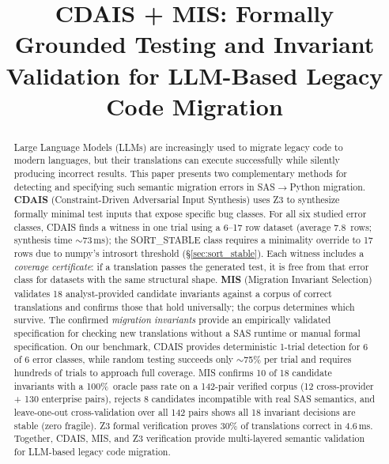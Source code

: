 \documentclass[conference]{IEEEtran}
\title{CDAIS + MIS: Formally Grounded Testing and Invariant\\
       Validation for LLM-Based Legacy Code Migration}
\author{
  \IEEEauthorblockN{Tesnime Ellabout}
  \IEEEauthorblockA{
    TekUp University\\
    Ariana 2083, Tunisia\\
    \texttt{ellaboutesnime@gmail.com}
  }

   \and
   \IEEEauthorblockN{Haythem Ghazouani}
   \IEEEauthorblockA{
    TekUp University\\
    Ariana 2083, Tunisia\\
    \texttt{haythemghz@yahoo.fr}
  }
}
\begin{document}

\maketitle

\begin{abstract}
Large Language Models (LLMs) are increasingly used to migrate legacy code to modern
languages, but their translations can execute successfully while silently producing
incorrect results. This paper presents two complementary methods for detecting and
specifying such semantic migration errors in SAS$\rightarrow$Python migration.
\textbf{CDAIS} (Constraint-Driven Adversarial Input Synthesis) uses Z3 to synthesize
formally minimal test inputs that expose specific bug classes. For all six studied
error classes, CDAIS finds a witness in one trial using a 6--17 row dataset
(average 7.8~rows; synthesis time $\sim$73\,ms); the SORT\_STABLE class requires
a minimality override to 17 rows due to numpy's introsort threshold
(\S\ref{sec:sort_stable}). Each witness includes a
\emph{coverage certificate}: if a translation passes the generated test, it is free
from that error class for datasets with the same structural shape. \textbf{MIS}
(Migration Invariant Selection) validates 18 analyst-provided candidate invariants
against a corpus of correct translations and confirms those that hold universally;
the corpus determines which survive.
The confirmed \emph{migration invariants} provide an empirically validated
specification for checking new translations without a SAS runtime or manual formal
specification.
On our benchmark, CDAIS provides deterministic 1-trial detection for 6 of 6 error
classes, while random testing succeeds only $\sim$75\% per trial and requires hundreds
of trials to approach full coverage. MIS confirms 10 of 18 candidate invariants with
a 100\%~oracle pass rate on a 142-pair verified corpus (12 cross-provider + 130
enterprise pairs), rejects 8 candidates incompatible with real SAS semantics, and
leave-one-out cross-validation over all 142 pairs shows all 18 invariant decisions
are stable (zero fragile). Z3 formal verification proves 30\% of
translations correct in 4.6\,ms. Together, CDAIS, MIS, and Z3 verification provide
multi-layered semantic validation for LLM-based legacy code migration.
\end{abstract}
\end{document}
